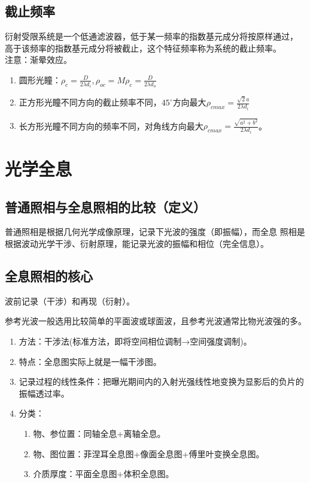 \documentclass[twocolumn]{ctexart}
\begin{document}
\subsection{截止频率}
衍射受限系统是一个低通滤波器，低于某一频率的指数基元成分将按原样通过，
高于该频率的指数基元成分将被截止，这个特征频率称为系统的截止频率。\\
注意：渐晕效应。
\begin{enumerate}
    \item 圆形光瞳：$\rho _c =\frac{D}{2\lambda d_i},\rho _{oc}=M\rho _c=\frac{D}{2\lambda d_o} $
    \item 正方形光瞳不同方向的截止频率不同，$45^\circ$方向最大$\rho _{cmax}=\frac{\sqrt{2}a}{2\lambda d_i}$
    \item 长方形光瞳不同方向的频率不同，对角线方向最大$\rho _{cmax}=\frac{\sqrt{a^2+b^2}}{2\lambda d_i}$。
\end{enumerate}

\section{光学全息}
\subsection{普通照相与全息照相的比较（定义）}
普通照相是根据几何光学成像原理，记录下光波的强度（即振幅），而全息
照相是根据波动光学干涉、衍射原理，能记录光波的振幅和相位（完全信息）。
\subsection{全息照相的核心}
波前记录（干涉）和再现（衍射）。\par
参考光波一般选用比较简单的平面波或球面波，且参考光波通常比物光波强的多。
\begin{enumerate}
    \item 方法：干涉法(标准方法，即将空间相位调制→空间强度调制)。
    \item 特点：全息图实际上就是一幅干涉图。
    \item 记录过程的线性条件：把曝光期间内的入射光强线性地变换为显影后的负片的振幅透过率。
    \item 分类：\begin{enumerate}
        \item 物、参位置：同轴全息+离轴全息。
        \item 物、图位置：菲涅耳全息图+像面全息图+傅里叶变换全息图。
        \item 介质厚度：平面全息图+体积全息图。
    \end{enumerate}
\end{enumerate}
\end{document}
